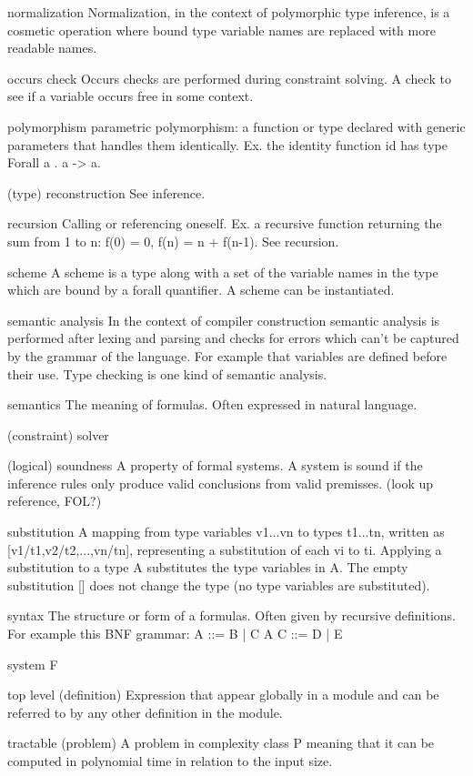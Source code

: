 normalization
Normalization, in the context of polymorphic type inference, is a cosmetic operation where bound type variable names are replaced with more readable names.

occurs check
Occurs checks are performed during constraint solving. A check to see if a variable occurs free in some context.

polymorphism
  parametric polymorphism: a function or type declared with generic parameters that handles them identically. Ex. the identity function id has type Forall a . a -> a.

(type) reconstruction
See inference.

recursion
Calling or referencing oneself. Ex. a recursive function returning the sum from 1 to n: f(0) = 0, f(n) = n + f(n-1).
See recursion.

scheme
A scheme is a type along with a set of the variable names in the type which are bound by a forall quantifier. A scheme can be instantiated.

semantic analysis
In the context of compiler construction semantic analysis is performed after lexing and parsing and checks for errors which can't be captured by the grammar of the language. For example that variables are defined before their use.
Type checking is one kind of semantic analysis.

semantics
The meaning of formulas. Often expressed in natural language.

(constraint) solver


(logical) soundness
A property of formal systems. A system is sound if the inference rules only produce valid conclusions from valid premisses.
(look up reference, FOL?)

substitution
A mapping from type variables v1...vn to types t1...tn, written as [v1/t1,v2/t2,...,vn/tn], representing a substitution of each vi to ti. Applying a substitution to a type A substitutes the type variables in A. The empty substitution [] does not change the type (no type variables are substituted).

syntax
The structure or form of a formulas. Often given by recursive definitions.
For example this BNF grammar:
A ::= B | C A
C ::= D | E

system F


top level (definition)
Expression that appear globally in a module and can be referred to by any other definition in the module.

tractable (problem)
A problem in complexity class P meaning that it can be computed in polynomial time in relation to the input size.

